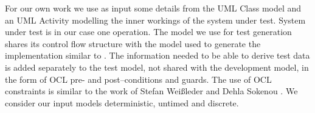 For our own work we use as input some details from the UML Class model and an UML Activity modelling the inner workings of the system under test. System under test is in our case one operation. The model we use for test generation shares its control flow structure with the model used to generate the implementation similar to \cite{Linzhang04GeneratingTestCasefromActivityGrayBoxMethod}. The information needed to be able to derive test data is added separately to the test model, not shared with the development model, in the form of OCL pre- and post--conditions and guards. The use of OCL constraints is similar to the work of Stefan Wei{\ss}leder and Dehla Sokenou \cite{weissleder2008automatic}. We consider our input models deterministic, untimed and discrete.%
